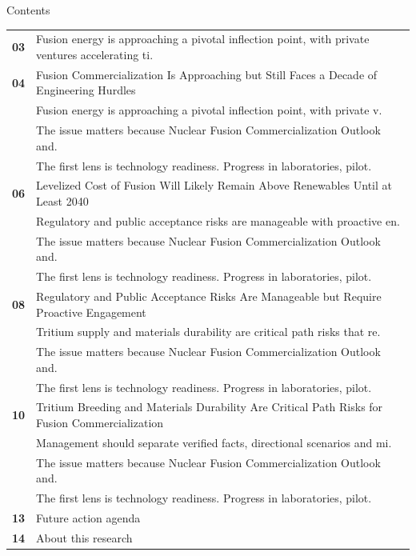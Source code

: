 \documentclass[10pt,a4paper]{article}
\begin{document}
\clearpage
{\sffamily\fontsize{26}{31}\selectfont\color{BONavy} Contents}\par\vspace{10pt}
\begin{tabularx}{\linewidth}{p{14mm}Y}
\textcolor{BOGreen}{\bfseries 03} & Fusion energy is approaching a pivotal inflection point, with private ventures accelerating ti. \\[7pt]
\textcolor{BOGreen}{\bfseries 04} & Fusion Commercialization Is Approaching but Still Faces a Decade of Engineering Hurdles \\[5pt]
 & {\scriptsize\color{BOMuted} Fusion energy is approaching a pivotal inflection point, with private v.} \\[1pt]
 & {\scriptsize\color{BOMuted} The issue matters because Nuclear Fusion Commercialization Outlook and.} \\[1pt]
 & {\scriptsize\color{BOMuted} The first lens is technology readiness. Progress in laboratories, pilot.} \\[1pt]
\textcolor{BOGreen}{\bfseries 06} & Levelized Cost of Fusion Will Likely Remain Above Renewables Until at Least 2040 \\[5pt]
 & {\scriptsize\color{BOMuted} Regulatory and public acceptance risks are manageable with proactive en.} \\[1pt]
 & {\scriptsize\color{BOMuted} The issue matters because Nuclear Fusion Commercialization Outlook and.} \\[1pt]
 & {\scriptsize\color{BOMuted} The first lens is technology readiness. Progress in laboratories, pilot.} \\[1pt]
\textcolor{BOGreen}{\bfseries 08} & Regulatory and Public Acceptance Risks Are Manageable but Require Proactive Engagement \\[5pt]
 & {\scriptsize\color{BOMuted} Tritium supply and materials durability are critical path risks that re.} \\[1pt]
 & {\scriptsize\color{BOMuted} The issue matters because Nuclear Fusion Commercialization Outlook and.} \\[1pt]
 & {\scriptsize\color{BOMuted} The first lens is technology readiness. Progress in laboratories, pilot.} \\[1pt]
\textcolor{BOGreen}{\bfseries 10} & Tritium Breeding and Materials Durability Are Critical Path Risks for Fusion Commercialization \\[5pt]
 & {\scriptsize\color{BOMuted} Management should separate verified facts, directional scenarios and mi.} \\[1pt]
 & {\scriptsize\color{BOMuted} The issue matters because Nuclear Fusion Commercialization Outlook and.} \\[1pt]
 & {\scriptsize\color{BOMuted} The first lens is technology readiness. Progress in laboratories, pilot.} \\[1pt]
\textcolor{BOGreen}{\bfseries 13} & Future action agenda \\[5pt]
\textcolor{BOGreen}{\bfseries 14} & About this research \\[5pt]
\end{tabularx}
\clearpage
\end{document}

